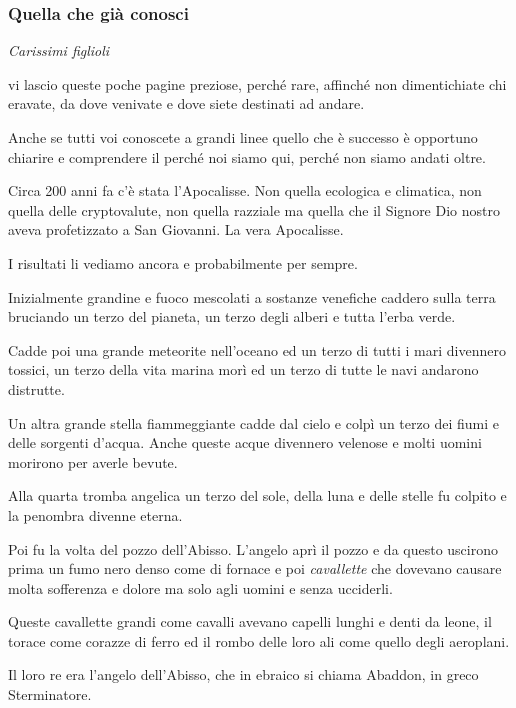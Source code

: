 \documentclass[a4paper,twoside,openany]{book}
\begin{document}
\begin{multicols}{2}

\subsubsection{Quella che già conosci}

\textit{Carissimi figlioli}

vi lascio queste poche pagine preziose, perché rare, affinché non dimentichiate chi eravate, da dove venivate e dove siete destinati ad andare.

Anche se tutti voi conoscete a grandi linee quello che è successo è opportuno chiarire e comprendere il perché noi siamo qui, perché non siamo andati oltre.

Circa 200 anni fa c'è stata l'Apocalisse. Non quella ecologica e climatica, non quella delle cryptovalute, non quella razziale ma quella che il Signore Dio nostro aveva profetizzato a San Giovanni. La vera Apocalisse.

I risultati li vediamo ancora e probabilmente per sempre.

Inizialmente grandine e fuoco mescolati a sostanze venefiche caddero sulla terra bruciando un terzo del pianeta, un terzo degli alberi e tutta l'erba verde.

Cadde poi una grande meteorite nell'oceano ed un terzo di tutti i mari divennero tossici, un terzo della vita marina morì ed un terzo di tutte le navi andarono distrutte.

Un altra grande stella fiammeggiante cadde dal cielo e colpì un terzo dei fiumi e delle sorgenti d'acqua. Anche queste acque divennero velenose e molti uomini morirono per averle bevute.

Alla quarta tromba angelica un terzo del sole, della luna e delle stelle fu colpito e la penombra divenne eterna.

Poi fu la volta del pozzo dell'Abisso. L'angelo aprì il pozzo e da questo uscirono prima un fumo nero denso come di fornace e poi \textit{cavallette} che dovevano causare molta sofferenza e dolore ma solo agli uomini e senza ucciderli.

Queste cavallette grandi come cavalli avevano capelli lunghi e denti da leone, il torace come corazze di ferro ed il rombo delle loro ali come quello degli aeroplani.

Il loro re era l’angelo dell’Abisso, che in ebraico si chiama Abaddon, in greco Sterminatore.


\end{multicols}
\end{document}
